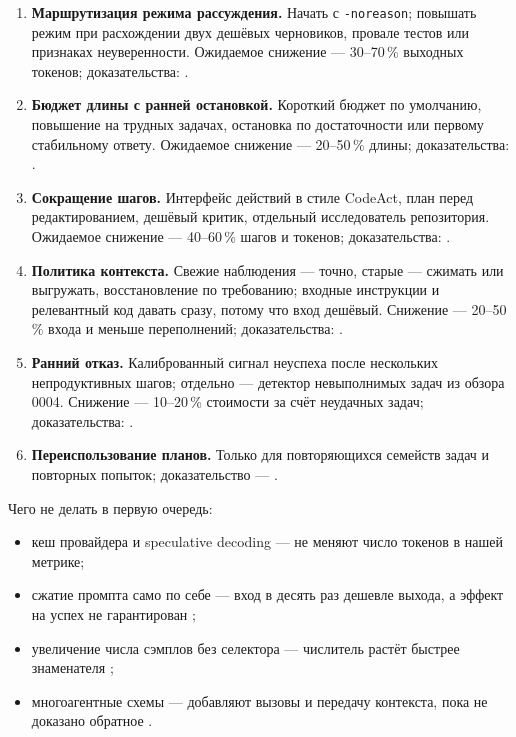 \documentclass[11pt,a4paper]{article}
\newcommand{\code}[1]{\texttt{#1}}
\begin{document}
\begin{enumerate}
  \item \textbf{Маршрутизация режима рассуждения.} Начать с
        \code{-noreason}; повышать режим при расхождении двух дешёвых
        черновиков, провале тестов или признаках неуверенности. Ожидаемое
        снижение — 30--70\,\% выходных токенов; доказательства:
        \cite{lee2026dartdraft,yang2026aresadaptive,ning2026hrbenchbenchmarkin,chen2023frugalgptuse}.
  \item \textbf{Бюджет длины с ранней остановкой.} Короткий бюджет по
        умолчанию, повышение на трудных задачах, остановка по достаточности
        или первому стабильному ответу. Ожидаемое снижение — 20--50\,\%
        длины; доказательства:
        \cite{han2024tokenbudget,yang2025dynamicearly,wang2026estarearly,li2025steeringllm,hosseini2026learningstop}.
  \item \textbf{Сокращение шагов.} Интерфейс действий в стиле CodeAct,
        план перед редактированием, дешёвый критик, отдельный исследователь
        репозитория. Ожидаемое снижение — 40--60\,\% шагов и токенов;
        доказательства:
        \cite{xu2026devilinterface,zhang2026fastcontexttrainin,gandhi2026steerdon,xia2024agentlessdemystify}.
  \item \textbf{Политика контекста.} Свежие наблюдения — точно, старые —
        сжимать или выгружать, восстановление по требованию; входные
        инструкции и релевантный код давать сразу, потому что вход дешёвый.
        Снижение — 20--50\,\% входа и меньше переполнений; доказательства:
        \cite{liu2025contexttool,sun2025scalinglong,xiao2026traceliteefficient,fan2026empiricalstudy,lulla2026impactagents}.
  \item \textbf{Ранний отказ.} Калиброванный сигнал неуспеха после
        нескольких непродуктивных шагов; отдельно — детектор невыполнимых
        задач из обзора 0004. Снижение — 10--20\,\% стоимости за счёт
        неудачных задач; доказательства:
        \cite{zellinger2025costsaving,luo2026heraharness,he2026allerrors}.
  \item \textbf{Переиспользование планов.} Только для повторяющихся
        семейств задач и повторных попыток; доказательство —
        \cite{zhang2025agenticplan}.
\end{enumerate}

Чего не делать в первую очередь:

\begin{itemize}
  \item кеш провайдера и speculative decoding — не меняют число токенов в
        нашей метрике;
  \item сжатие промпта само по себе — вход в десять раз дешевле выхода,
        а эффект на успех не гарантирован \cite{weinberger2026tokenreduction};
  \item увеличение числа сэмплов без селектора — числитель растёт быстрее
        знаменателя \cite{ehrlich2025codemonkeysscaling};
  \item многоагентные схемы — добавляют вызовы и передачу контекста, пока
        не доказано обратное \cite{wang2025efficientagents}.
\end{itemize}
\end{document}
